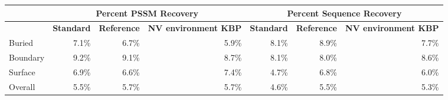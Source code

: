 
\begin{tabular}{|l||r|r|r|r|r|r|}
\hline
 & \multicolumn{3}{c}{\textbf{Percent PSSM Recovery}} & \multicolumn{3}{|c|}{\textbf{Percent Sequence Recovery}}\\
\hline
  & \textbf{Standard} & \textbf{Reference} & \textbf{NV environment KBP} & \textbf{Standard} & \textbf{Reference} & \textbf{NV environment KBP} \\
\hline
\hline
Buried & 7.1\% & 6.7\% & 5.9\% & 8.1\% & 8.9\% & 7.7\%\\
\hline
Boundary & 9.2\% & 9.1\% & 8.7\% & 8.1\% & 8.0\% & 8.6\%\\
\hline
Surface & 6.9\% & 6.6\% & 7.4\% & 4.7\% & 6.8\% & 6.0\%\\
\hline
Overall & 5.5\% & 5.7\% & 5.7\% & 4.6\% & 5.5\% & 5.3\%\\
\hline
\end{tabular}